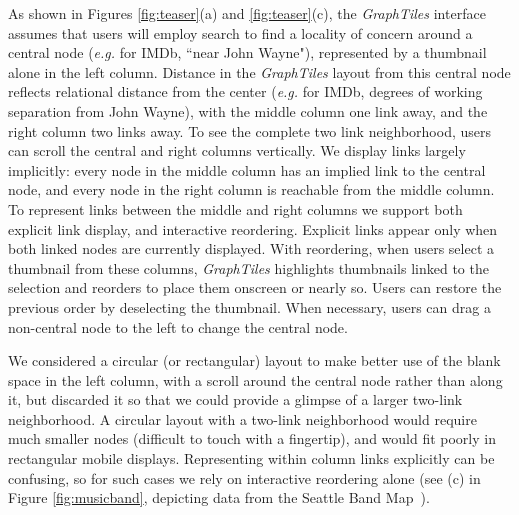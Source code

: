 As shown in Figures \ref{fig:teaser}(a) and \ref{fig:teaser}(c), the \textit{GraphTiles} interface assumes that users will employ search to find a locality of concern around a central node (\textit{e.g.} for IMDb, ``near John Wayne"), represented by a thumbnail alone in the left column. Distance in the \textit{GraphTiles} layout from this central node reflects relational distance from the center (\textit{e.g.} for IMDb, degrees of working separation from John Wayne), with the middle column one link away, and the right column two links away. To see the complete two link neighborhood, users can scroll the central and right columns vertically. We display links largely implicitly: every node in the middle column has an implied link to the central node, and every node in the right column is reachable from the middle column. To represent links between the middle and right columns we support both explicit link display, and interactive reordering. Explicit links appear only when both linked nodes are currently displayed. With reordering, when users select a thumbnail from these columns, \textit{GraphTiles} highlights thumbnails linked to the selection and reorders to place them onscreen or nearly so. Users can restore the previous order by deselecting the thumbnail. When necessary, users can drag a non-central node to the left to change the central node.

We considered a circular (or rectangular) layout to make better use of the blank space in the left column, with a scroll around the central node rather than along it, but discarded it so that we could provide a glimpse of a larger two-link neighborhood. A circular layout with a two-link neighborhood would require much smaller nodes (difficult to touch with a fingertip), and would fit poorly in rectangular mobile displays. Representing within column links explicitly can be confusing, so for such cases we rely on interactive reordering alone (see (c) in Figure \ref{fig:musicband}, depicting data from the Seattle Band Map~\cite{seattleband}).
